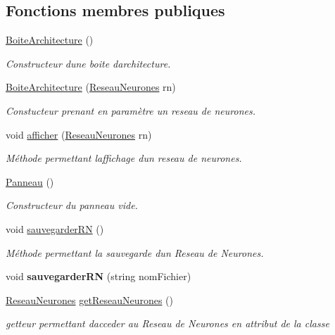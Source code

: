 \subsection*{Fonctions membres publiques}
\begin{DoxyCompactItemize}
\item 
\mbox{\label{class_panneau_a8fb82bab20bdc45acfe9234f3fb9a38e}} 
\hyperlink{class_panneau_a8fb82bab20bdc45acfe9234f3fb9a38e}{Boite\+Architecture} ()
\begin{DoxyCompactList}\small\item\em Constructeur d\textquotesingle{}une boite d\textquotesingle{}architecture. \end{DoxyCompactList}\item 
\hyperlink{class_panneau_a2c86ba058850b199a83eb4a35541531c}{Boite\+Architecture} (\hyperlink{class_reseau_neurones}{Reseau\+Neurones} rn)
\begin{DoxyCompactList}\small\item\em Constucteur prenant en paramètre un reseau de neurones. \end{DoxyCompactList}\item 
void \hyperlink{class_panneau_a0990ee55f48bc73a20f9079fa8e2582d}{afficher} (\hyperlink{class_reseau_neurones}{Reseau\+Neurones} rn)
\begin{DoxyCompactList}\small\item\em Méthode permettant l\textquotesingle{}affichage d\textquotesingle{}un reseau de neurones. \end{DoxyCompactList}\item 
\mbox{\label{class_panneau_a6d15af2ca1be32f371599285f3edbbcc}} 
\hyperlink{class_panneau_a6d15af2ca1be32f371599285f3edbbcc}{Panneau} ()
\begin{DoxyCompactList}\small\item\em Constructeur du panneau vide. \end{DoxyCompactList}\item 
\mbox{\label{class_panneau_a390b3758b0280bfa67add85464775016}} 
void \hyperlink{class_panneau_a390b3758b0280bfa67add85464775016}{sauvegarder\+RN} ()
\begin{DoxyCompactList}\small\item\em Méthode permettant la sauvegarde d\textquotesingle{}un Reseau de Neurones. \end{DoxyCompactList}\item 
\mbox{\label{class_panneau_a3f7414f7c42e6378fbea049c246db2a9}} 
void {\bfseries sauvegarder\+RN} (string nom\+Fichier)
\item 
\hyperlink{class_reseau_neurones}{Reseau\+Neurones} \hyperlink{class_panneau_a8ed7e5db0c0c8a0da729d3c785032643}{get\+Reseau\+Neurones} ()
\begin{DoxyCompactList}\small\item\em getteur permettant d\textquotesingle{}acceder au Reseau de Neurones en attribut de la classe \end{DoxyCompactList}\end{DoxyCompactItemize}

